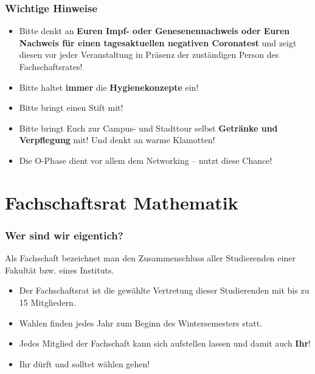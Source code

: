 \documentclass[10pt]{beamer}
\makeatletter
\newcommand{\highl}[1]{\color{tuccolor@ma}#1\color{black}}
\makeatother
\begin{document}
\begin{frame}

	\frametitle{Wichtige Hinweise}

	\begin{itemize}
		\item Bitte denkt an \textbf{Euren Impf- oder Genesenennachweis oder Euren Nachweis für einen tagesaktuellen negativen Coronatest} und zeigt diesen vor jeder Veranstaltung in Präsenz der zuständigen Person des Fachschaftsrates!
		\item Bitte haltet \textbf{immer} die \textbf{Hygienekonzepte} ein!
		\item Bitte bringt einen Stift mit!
		\item Bitte bringt Euch zur Campus- und Stadttour selbst \textbf{Getränke und Verpflegung} mit! Und denkt an warme Klamotten!
		\item \highl{Die O-Phase dient vor allem dem Networking -- nutzt diese Chance!}
	\end{itemize}
\end{frame}


\section{Fachschaftsrat Mathematik}
\frame{\tableofcontents[currentsection]}

\begin{frame}
	\frametitle{Wer sind wir eigentich?}

	\begin{block}{\vphantom{X}}
		Als Fachschaft bezeichnet man den Zusammenschluss aller Studierenden einer Fakultät bzw. eines Instituts.
	\end{block}

	\begin{itemize}
		\item Der Fachschaftsrat ist die gewählte Vertretung dieser Studierenden mit bis zu 15 Mitgliedern.
		\item Wahlen finden jedes Jahr zum Beginn des Wintersemesters statt.
		\item Jedes Mitglied der Fachschaft kann sich aufstellen lassen und damit auch \textbf{Ihr}!
		\item \highl{Ihr dürft und solltet wählen gehen!}
	\end{itemize}
\end{frame}
\end{document}
